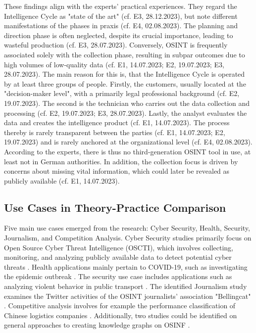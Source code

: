 \documentclass[10pt]{article}
\begin{document}
These findings align with the experts' practical experiences. They regard the Intelligence Cycle as "state of the art" (cf. E3, 28.12.2023), but note different manifestations of the phases in praxis (cf. E4, 02.08.2023).
The planning and direction phase is often neglected, despite its crucial importance, leading to wasteful production (cf. E3, 28.07.2023). Conversely, OSINT is frequently associated solely with the collection phase,
resulting in subpar outcomes due to high volumes of low-quality data (cf. E1, 14.07.2023; E2, 19.07.2023; E3, 28.07.2023). The main reason for this is, that the Intelligence Cycle is operated by at least three groups of people. Firstly, the customers, usually located at the "decision-maker level", with a primarily legal professional background (cf. E2, 19.07.2023).
The second is the technician who carries out the data collection and processing (cf. E2, 19.07.2023; E3, 28.07.2023). Lastly, the analyst evaluates the data and creates the intelligence product (cf. E1, 14.07.2023). The process thereby is rarely transparent between the parties
(cf. E1, 14.07.2023; E2, 19.07.2023) and is rarely anchored at the organizational level (cf. E4, 02.08.2023). According to the experts, there is thus no third-generation
OSINT tool in use, at least not in German authorities. In addition, the collection focus is driven by concerns about missing vital information, which could later be revealed as publicly available (cf. E1, 14.07.2023).

\subsection{Use Cases in Theory-Practice Comparison}

Five main use cases emerged from the research: Cyber Security, Health, Security, Journalism,
and Competition Analysis. Cyber Security studies primarily focus on Open Source Cyber Threat
Intelligence (OSCTI), which involves collecting, monitoring, and analyzing publicly available
data to detect potential cyber threats \cite{Ahuja.2022,AlDmour.2023}.
Health applications mainly pertain to COVID-19, such as investigating the epidemic outbreak \cite{Kpozehouen.2020}.
The security use case includes applications such as
analyzing violent behavior in public transport \cite{Nobili.2021}. The identified Journalism study examines the
Twitter activities of the OSINT journalists' association "Bellingcat" \cite{Bar.2023}. Competitive analysis
involves for example the performance classification of Chinese logistics companies \cite{Tao.2023}. Additionally, two
studies could be identified on general approaches to creating knowledge graphs on OSINF \cite{Hu.2023,Ma.2022}.
\end{document}
